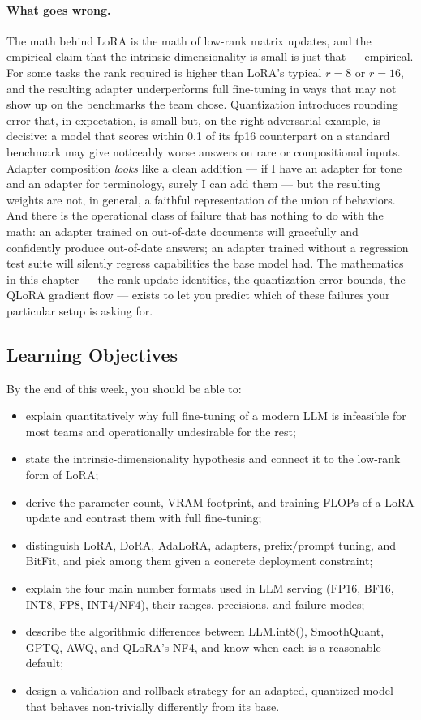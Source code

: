 \paragraph{What goes wrong.}
The math behind LoRA is the math of low-rank matrix updates, and the
empirical claim that the intrinsic dimensionality is small is just
that --- empirical. For some tasks the rank required is higher than
LoRA's typical $r=8$ or $r=16$, and the resulting adapter
underperforms full fine-tuning in ways that may not show up on the
benchmarks the team chose. Quantization introduces rounding error
that, in expectation, is small but, on the right adversarial
example, is decisive: a model that scores within 0.1 of its fp16
counterpart on a standard benchmark may give noticeably worse
answers on rare or compositional inputs. Adapter composition
\emph{looks} like a clean addition --- if I have an adapter for tone
and an adapter for terminology, surely I can add them --- but the
resulting weights are not, in general, a faithful representation of
the union of behaviors. And there is the operational class of
failure that has nothing to do with the math: an adapter trained on
out-of-date documents will gracefully and confidently produce
out-of-date answers; an adapter trained without a regression test
suite will silently regress capabilities the base model had. The
mathematics in this chapter --- the rank-update identities, the
quantization error bounds, the QLoRA gradient flow --- exists to
let you predict which of these failures your particular setup is
asking for.

\subsection{Learning Objectives}

By the end of this week, you should be able to:
\begin{itemize}
  \item explain quantitatively why full fine-tuning of a modern LLM is
        infeasible for most teams and operationally undesirable for the rest;
  \item state the intrinsic-dimensionality hypothesis and connect it to the
        low-rank form of LoRA;
  \item derive the parameter count, VRAM footprint, and training FLOPs of a
        LoRA update and contrast them with full fine-tuning;
  \item distinguish LoRA, DoRA, AdaLoRA, adapters, prefix/prompt tuning, and
        BitFit, and pick among them given a concrete deployment constraint;
  \item explain the four main number formats used in LLM serving (FP16, BF16,
        INT8, FP8, INT4/NF4), their ranges, precisions, and failure modes;
  \item describe the algorithmic differences between LLM.int8(),
        SmoothQuant, GPTQ, AWQ, and QLoRA's NF4, and know when each is a
        reasonable default;
  \item design a validation and rollback strategy for an adapted, quantized
        model that behaves non-trivially differently from its base.
\end{itemize}

